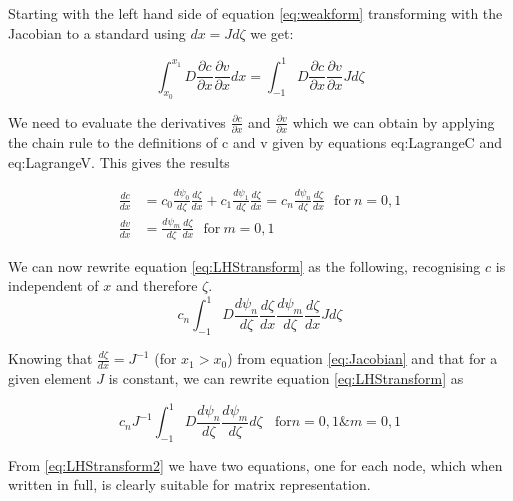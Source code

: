\documentclass[11pt]{article}
\begin{document}
Starting with the left hand side of equation \ref{eq:weakform} transforming with the Jacobian to a standard using $dx = Jd\zeta$ we get:

\begin{equation} \label{eq:LHStransform}
\int_{x_0}^{x_{1}} D \frac{\partial c}{\partial x}  \frac{\partial v}{\partial x}  dx =  \int_{-1}^{1} D \frac{\partial c}{\partial x}  \frac{\partial v}{\partial x} J d\zeta
\end{equation}

We need to evaluate the derivatives $\frac{\partial c}{\partial x}$ and $ \frac{\partial v}{\partial x}$ which we can obtain by applying the chain rule to the definitions of c and v given by equations {eq:LagrangeC} and {eq:LagrangeV}. This gives the results

\begin{subequations}
\label{eq:LagrangeD}
\begin{align}
\frac{dc}{dx} &= c_{0}\frac{d\psi_{0}}{d\zeta}\frac{d\zeta}{dx} + c_1\frac{d\psi_{1}}{d\zeta}\frac{d\zeta}{dx} = c_n\frac{d\psi_{n}}{d\zeta}\frac{d\zeta}{dx} \label{eq:LagrangeDC} \ \ \ \text{for} \ n =0,1\\
\frac{dv}{dx} &= \frac{d\psi_{m}}{d\zeta}\frac{d\zeta}{dx} \ \ \ \text{for} \ m =0,1 \label{eq:LagrangeDV} 
\end{align}
\end{subequations}

We can now rewrite equation \ref{eq:LHStransform} as the following, recognising $c$ is independent of $x$ and therefore $\zeta$.
\begin{equation} \label{eq:LHStransform}
 c_n\int_{-1}^{1} D \frac{d\psi_{n}}{d\zeta}\frac{d\zeta}{dx} \frac{d\psi_{m}}{d\zeta}\frac{d\zeta}{dx} J d\zeta
\end{equation}

Knowing that $\frac{d\zeta}{dx} = J^{-1}$ (for $x_1 > x_0$) from equation \ref{eq:Jacobian} and that for a given element $J$ is constant, we can rewrite equation \ref{eq:LHStransform} as

\begin{equation} \label{eq:LHStransform2}
 c_nJ^{-1}\int_{-1}^{1} D \frac{d\psi_{n}}{d\zeta}\frac{d\psi_{m}}{d\zeta} d\zeta \ \ \ \ \text{for} n= 0,1 \& m = 0,1
\end{equation}




From \ref{eq:LHStransform2} we have two equations, one for each node, which when written in full, is clearly suitable for matrix representation.
\end{document}
